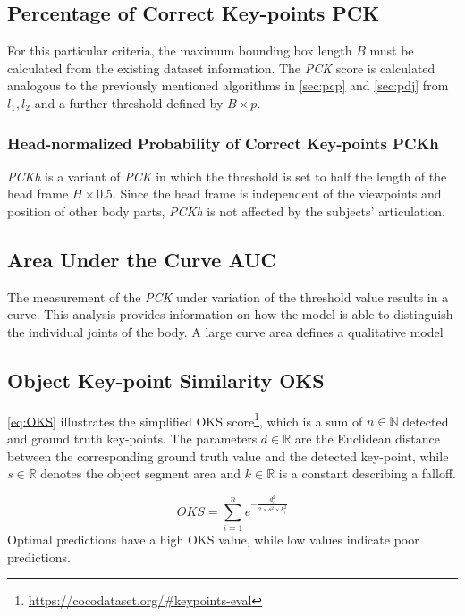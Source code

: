 \subsection{Percentage of Correct Key-points PCK}
For this particular criteria, the maximum bounding box length $B$ must be calculated from the existing dataset information. The \emph{PCK} score is calculated analogous to the previously mentioned algorithms in \autoref{sec:pcp} and \autoref{sec:pdj} from $l_{1}, l_{2}$ and a further threshold defined by $B \times p$. \cite{mpii, pck}

\subsubsection{Head-normalized Probability of Correct Key-points PCKh}
\emph{PCKh} is a variant of \emph{PCK} in which the threshold is set to half the length of the head frame $H \times 0.5$. Since the head frame is independent of the viewpoints and position of other body parts, \emph{PCKh} is not affected by the subjects' articulation. \cite{mpii}

\subsection{Area Under the Curve AUC}
The measurement of the \emph{PCK} under variation of the threshold value results in a curve. This analysis provides information on how the model is able to distinguish the individual joints of the body. A large curve area defines a qualitative model %

\subsection{Object Key-point Similarity OKS}
\autoref{eq:OKS} illustrates the simplified OKS score\footnote{\url{https://cocodataset.org/\#keypoints-eval}}, which is a sum of $ n \in \mathbb{N}$ detected and ground truth key-points. The parameters $d \in \mathbb{R}$ are the Euclidean distance between the corresponding ground truth value and the detected key-point, while $s \in \mathbb{R}$ denotes the object segment area and $k \in \mathbb{R}$ is a constant describing a falloff. 

\begin{equation}
    \label{eq:OKS}
    OKS = \sum_{i=1}^{n} e^{- \frac{d_{i}^{2}}{2 \times s^{2} \times k_{i}^{2}}}
\end{equation}
Optimal predictions have a high OKS value, while low values indicate poor predictions. 
